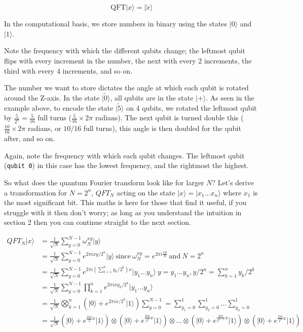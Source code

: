 \documentclass{article}
\begin{document}
\[
\text{QFT}|x\rangle = |\widetilde{x}\rangle
\]




In the computational basis, we store numbers in binary using the states
\(|0\rangle\) and \(|1\rangle\).

Note the frequency with which the different qubits change; the leftmost
qubit flips with every increment in the number, the next with every 2
increments, the third with every 4 increments, and so on.

The number we want to store dictates the angle at which each qubit is
rotated around the Z-axis. In the state \(|\widetilde{0}\rangle\), all
qubits are in the state \(|{+}\rangle\). As seen in the example above,
to encode the state \(|\widetilde{5}\rangle\) on 4 qubits, we rotated
the leftmost qubit by \(\tfrac{5}{2^n} = \tfrac{5}{16}\) full turns
(\(\tfrac{5}{16}\times 2\pi\) radians). The next qubit is turned double
this (\(\tfrac{10}{16}\times 2\pi\) radians, or \(10/16\) full turns),
this angle is then doubled for the qubit after, and so on.

Again, note the frequency with which each qubit changes. The leftmost
qubit (\texttt{qubit\ 0}) in this case has the lowest frequency, and the
rightmost the highest.


So what does the quantum Fourier transform look like for larger \(N\)?
Let's derive a transformation for \(N=2^n\), \(QFT_N\) acting on the
state \(\vert x \rangle = \vert x_1\ldots x_n \rangle\) where \(x_1\) is
the most significant bit. This maths is here for those that find it
useful, if you struggle with it then don't worry; as long as you
understand the intuition in section 2 then you can continue straight to
the next section.

\[
\begin{aligned}
QFT_N\vert x \rangle & = \frac{1}{\sqrt{N}} \sum_{y=0}^{N-1}\omega_N^{xy} \vert y \rangle 
\\
& = \frac{1}{\sqrt{N}} \sum_{y=0}^{N-1} e^{2 \pi i xy / 2^n} \vert y \rangle ~\text{since}\: \omega_N^{xy} = e^{2\pi i \frac{xy}{N}} \:\text{and}\: N = 2^n 
\\
& = \frac{1}{\sqrt{N}} \sum_{y=0}^{N-1} e^{2 \pi i \left(\sum_{k=1}^n y_k/2^k\right) x} \vert y_1 \ldots y_n \rangle \: y = y_1\ldots y_n, y/2^n = \sum_{k=1}^n y_k/2^k 
\\
& = \frac{1}{\sqrt{N}} \sum_{y=0}^{N-1} \prod_{k=1}^n e^{2 \pi i x y_k/2^k } \vert y_1 \ldots y_n \rangle 
\\
& = \frac{1}{\sqrt{N}} \bigotimes_{k=1}^n  \left(\vert0\rangle + e^{2 \pi i x /2^k } \vert1\rangle \right) 
\sum_{y=0}^{N-1} = \sum_{y_1=0}^{1}\sum_{y_2=0}^{1}\ldots\sum_{y_n=0}^{1} 
\\
& = \frac{1}{\sqrt{N}}
\left(\vert0\rangle + e^{\frac{2\pi i}{2}x} \vert1\rangle\right) 
\otimes
\left(\vert0\rangle + e^{\frac{2\pi i}{2^2}x} \vert1\rangle\right) 
\otimes  
\ldots
\otimes
\left(\vert0\rangle + e^{\frac{2\pi i}{2^{n-1}}x} \vert1\rangle\right) 
\otimes
\left(\vert0\rangle + e^{\frac{2\pi i}{2^n}x} \vert1\rangle\right) 
\end{aligned}
\]
\end{document}
